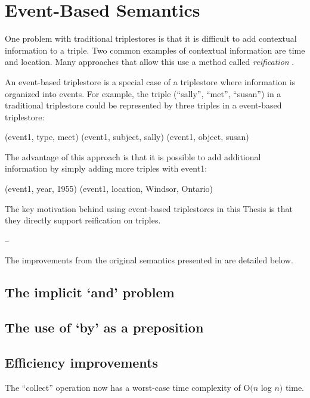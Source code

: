 \documentclass[../main.tex]{subfiles}
\begin{document}
\chapter {Event-Based Semantics}

One problem with traditional triplestores is that it is difficult to add contextual information to a triple.  Two common examples of contextual information are time and location.  Many approaches that allow this use a method called {\em reification} \cite{?}.

An event-based triplestore is a special case of a triplestore where information is organized into events.  For example, the triple (``sally'', ``met'', ``susan'') in a traditional triplestore could be represented by three triples in a event-based triplestore:

\begin{code}
	(event1, type, meet)
	(event1, subject, sally)
	(event1, object, susan)
\end{code}

The advantage of this approach is that it is possible to add additional information by simply adding more triples with event1:

\begin{code}
	(event1, year, 1955)
	(event1, location, Windsor, Ontario)
\end{code}

The key motivation behind using event-based triplestores in this Thesis is that they directly support reification on triples\cite{frostagboola2014}.

--

The improvements from the original semantics presented in \cite{frost2014demonstration} \cite{frostagbola2014} are detailed below.

\section{The implicit `and' problem}

\section{The use of `by' as a preposition}

\section{Efficiency improvements}

The ``collect'' operation now has a worst-case time complexity of O$(n$ log $n)$ time.
\end{document}
